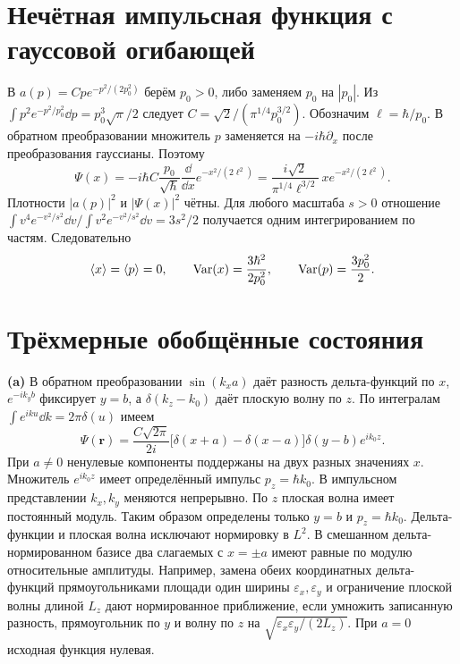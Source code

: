 \documentclass[11pt,a4paper]{article}
\begin{document}
\section{Нечётная импульсная функция с гауссовой огибающей}

В \(a(p)=Cp e^{-p^2/(2p_0^2)}\) берём \(p_0>0\), либо заменяем
\(p_0\) на \(|p_0|\).
Из \(\int p^2e^{-p^2/p_0^2}\dd p=p_0^3\sqrt\pi/2\)
следует \(C=\sqrt2/(\pi^{1/4}p_0^{3/2})\).
Обозначим \(\ell=\hbar/p_0\). В обратном преобразовании
множитель \(p\) заменяется на \(-i\hbar\partial_x\) после
преобразования гауссианы. Поэтому
\[
 \Psi(x)=-i\hbar C\frac{p_0}{\sqrt\hbar}\frac{\dd}{\dd x}
               e^{-x^2/(2\ell^2)}
        =\frac{i\sqrt2}{\pi^{1/4}\ell^{3/2}}\,x e^{-x^2/(2\ell^2)}.
\]
Плотности \(|a(p)|^2\) и \(|\Psi(x)|^2\) чётны.
Для любого масштаба \(s>0\) отношение
\(\int v^4 e^{-v^2/s^2}\dd v/\int v^2 e^{-v^2/s^2}\dd v
=3s^2/2\) получается одним интегрированием по частям. Следовательно
\[
 \langle x\rangle=\langle p\rangle=0,\qquad
 \operatorname{Var}(x)=\frac{3\hbar^2}{2p_0^2},\qquad \operatorname{Var}(p)=\frac{3p_0^2}{2}.
\]

\section{Трёхмерные обобщённые состояния}

\textbf{(a)} В обратном преобразовании \(\sin(k_xa)\) даёт
разность дельта-функций по \(x\), \(e^{-ik_y b}\) фиксирует \(y=b\),
а \(\delta(k_z-k_0)\) даёт плоскую волну по \(z\). По интегралам
\(\int e^{iku}\dd k=2\pi\delta(u)\) имеем
\[
 \Psi(\mathbf r)=\frac{C\sqrt{2\pi}}{2i}
       \bigl[\delta(x+a)-\delta(x-a)\bigr]\delta(y-b)e^{ik_0z}.
\]
При \(a\ne0\) ненулевые компоненты поддержаны на двух разных
значениях \(x\). Множитель \(e^{ik_0z}\) имеет определённый
импульс \(p_z=\hbar k_0\). В импульсном представлении \(k_x,k_y\)
меняются непрерывно. По \(z\) плоская волна имеет постоянный модуль.
Таким образом определены только \(y=b\) и \(p_z=\hbar k_0\).
Дельта-функции и плоская волна исключают нормировку в \(L^2\).
В смешанном дельта-нормированном базисе два слагаемых с \(x=\pm a\)
имеют равные по модулю относительные амплитуды. Например, замена
обеих координатных дельта-функций прямоугольниками площади один
ширины \(\varepsilon_x,\varepsilon_y\) и ограничение плоской волны
длиной \(L_z\) дают нормированное приближение, если умножить
записанную разность, прямоугольник по \(y\) и волну по \(z\)
на \(\sqrt{\varepsilon_x\varepsilon_y/(2L_z)}\).
При \(a=0\) исходная функция нулевая.
\end{document}
